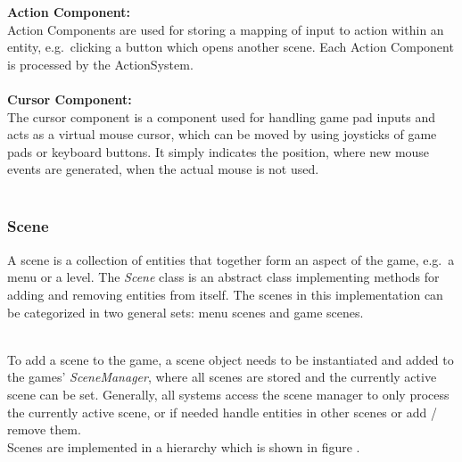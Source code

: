 \textbf{Action Component:} \\
Action Components are used for storing a mapping of input to action within an entity, e.g.\ clicking a button which opens another scene.
Each Action Component is processed by the ActionSystem. \\ \\

\textbf{Cursor Component:} \\
The cursor component is a component used for handling game pad inputs and acts as a virtual mouse cursor, which can be moved by using
joysticks of game pads or keyboard buttons.
It simply indicates the position, where new mouse events are generated, when the actual mouse is not used. \\ \\

\subsubsection{Scene}\label{subsubsec:scene}
A scene is a collection of entities that together form an aspect of the game, e.g.\ a menu or a level.
The \textit{Scene} class is an abstract class implementing methods for adding and removing entities from itself.
The scenes in this implementation can be categorized in two general sets: menu scenes and game scenes.

\\
To add a scene to the game, a scene object needs to be instantiated and added to the games' \textit{SceneManager}, where all
scenes are stored and the currently active scene can be set.
Generally, all systems access the scene manager to only process the currently active scene, or if needed handle entities in other scenes or add / remove them.
\\

Scenes are implemented in a hierarchy which is shown in figure .

